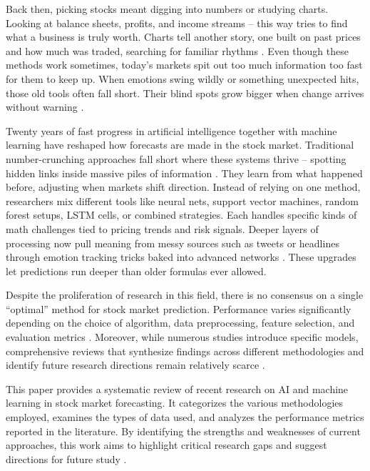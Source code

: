 \documentclass[11pt,a4paper]{article}
\begin{document}
Back then, picking stocks meant digging into numbers or studying charts. Looking at balance sheets,
profits, and income streams -- this way tries to find what a business is truly worth. Charts tell
another story, one built on past prices and how much was traded, searching for familiar rhythms
\cite{subasi2021}. Even though these methods work sometimes, today's markets spit out too much
information too fast for them to keep up. When emotions swing wildly or something unexpected hits,
those old tools often fall short. Their blind spots grow bigger when change arrives without warning
\cite{kumar2022}.

Twenty years of fast progress in artificial intelligence together with machine learning have reshaped
how forecasts are made in the stock market. Traditional number-crunching approaches fall short where
these systems thrive -- spotting hidden links inside massive piles of information \cite{rouf2021}. They
learn from what happened before, adjusting when markets shift direction. Instead of relying on one
method, researchers mix different tools like neural nets, support vector machines, random forest
setups, LSTM cells, or combined strategies. Each handles specific kinds of math challenges tied to
pricing trends and risk signals. Deeper layers of processing now pull meaning from messy sources such
as tweets or headlines through emotion tracking tricks baked into advanced networks \cite{khan2022}.
These upgrades let predictions run deeper than older formulas ever allowed.

Despite the proliferation of research in this field, there is no consensus on a single ``optimal'' method
for stock market prediction. Performance varies significantly depending on the choice of algorithm,
data preprocessing, feature selection, and evaluation metrics \cite{ferreira2021}. Moreover, while
numerous studies introduce specific models, comprehensive reviews that synthesize findings across
different methodologies and identify future research directions remain relatively scarce
\cite{sizan2023,soni2022}.

This paper provides a systematic review of recent research on AI and machine learning in stock market
forecasting. It categorizes the various methodologies employed, examines the types of data used, and
analyzes the performance metrics reported in the literature. By identifying the strengths and
weaknesses of current approaches, this work aims to highlight critical research gaps and suggest
directions for future study \cite{rouf2021,sizan2023}.
\end{document}
